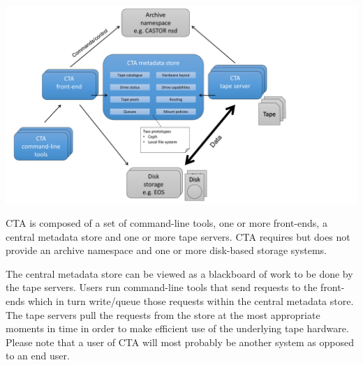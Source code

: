 \documentclass{article}
\begin{document}
\includegraphics[width=\linewidth]{cta_architecture_simple}

CTA is composed of a set of command-line tools, one or more front-ends, a central metadata store and one or more tape servers.  CTA requires but does not provide an archive namespace and one or more disk-based storage systems.

The central metadata store can be viewed as a blackboard of work to be done by the tape servers.  Users run command-line tools that send requests to the front-ends which in turn write/queue those requests within the central metadata store.  The tape servers pull the requests from the store at the most appropriate moments in time in order to make efficient use of the underlying tape hardware.  Please note that a user of CTA will most probably be another system as opposed to an end user.

\newpage
\end{document}
